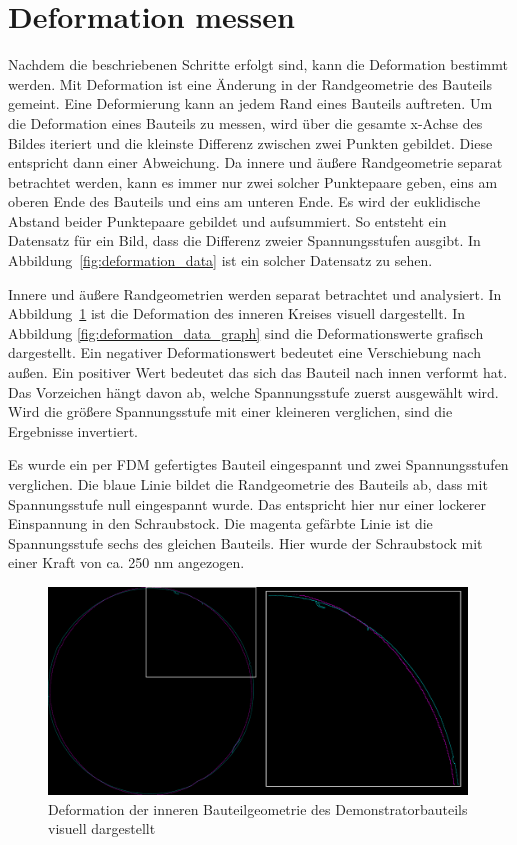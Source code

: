 \section{Deformation messen} \label{defoinfo}

Nachdem die beschriebenen Schritte erfolgt sind, kann die Deformation bestimmt werden.
Mit Deformation ist eine Änderung in der Randgeometrie des Bauteils gemeint.
Eine Deformierung kann an jedem Rand eines Bauteils auftreten.
Um die Deformation eines Bauteils zu messen, wird über die 
gesamte x-Achse des Bildes iteriert und die kleinste Differenz 
zwischen zwei Punkten gebildet. Diese entspricht dann einer Abweichung. 
Da innere und äußere Randgeometrie separat betrachtet werden, kann es immer nur zwei
solcher Punktepaare geben, eins am oberen Ende des Bauteils und eins am unteren Ende.
Es wird der euklidische Abstand beider Punktepaare gebildet und aufsummiert.
So entsteht ein Datensatz für ein Bild, 
dass die Differenz zweier Spannungsstufen ausgibt. In Abbildung~\ref{fig:deformation_data}
ist ein solcher Datensatz zu sehen. 

Innere und äußere Randgeometrien werden separat betrachtet und analysiert.
In Abbildung~\ref{fig:deformation_data_vis} ist die Deformation des inneren Kreises
visuell dargestellt. In Abbildung \ref{fig:deformation_data_graph} sind die 
Deformationswerte grafisch dargestellt. Ein negativer Deformationswert bedeutet eine 
Verschiebung nach außen. Ein positiver Wert bedeutet das sich das Bauteil nach 
innen verformt hat. Das Vorzeichen hängt davon ab, welche Spannungsstufe zuerst ausgewählt
wird. Wird die größere Spannungsstufe mit einer kleineren verglichen, sind die Ergebnisse
invertiert.

Es wurde ein per FDM gefertigtes Bauteil eingespannt und zwei Spannungsstufen verglichen.
Die blaue Linie bildet die Randgeometrie des Bauteils ab, dass mit Spannungsstufe
null eingespannt wurde. Das entspricht hier nur einer lockerer Einspannung in den 
Schraubstock. Die magenta gefärbte Linie ist die Spannungsstufe sechs des gleichen
Bauteils. Hier wurde der Schraubstock mit einer Kraft von ca. 250 nm angezogen.

\begin{figure}[H]
    \centering
    \includegraphics[width=0.99\textwidth]{images/FDM2_SP0_stitched_FDM2_SP4_stitched_1_1_cut.png}
    \caption{Deformation der inneren Bauteilgeometrie des Demonstratorbauteils 
    visuell dargestellt}
    \label{fig:deformation_data_vis}
\end{figure}

